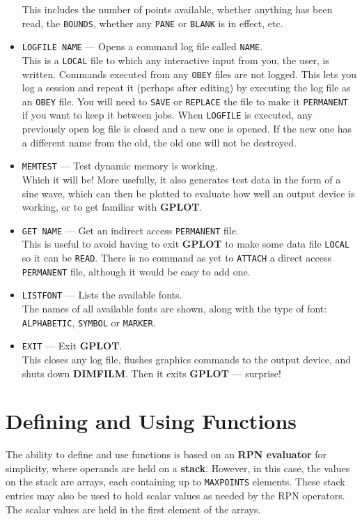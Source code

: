 \documentclass[a4paper,twoside,11pt]{article}
\newcommand{\textttc}[1]{\texttt{\textcolor{OurRed}{#1}}}
\begin{document}
\begin{itemize}
   This includes the number of points available, whether anything has been read, the \texttt{BOUNDS}, whether
   any \texttt{PANE} or \texttt{BLANK} is in effect, etc.
\item \textttc{LOGFILE NAME} --- Opens a command log file called \texttt{NAME}.\\
   This is a \texttt{LOCAL} file to which any interactive input from you, the user, is written. Commands executed
   from any \texttt{OBEY} files are not logged. This lets you log a session and repeat it (perhaps after editing)
   by executing the log file as an \texttt{OBEY} file. You will need to \texttt{SAVE} or \texttt{REPLACE} the file to make it
   \texttt{PERMANENT} if you want to keep it between jobs. When \texttt{LOGFILE} is executed, any previously open log file
   is closed and a new one is opened. If the new one has a different name from the old, the old one will
   not be destroyed.
\item \textttc{MEMTEST} --- Test dynamic memory is working.\\
   Which it will be! More usefully, it also generates test data in the form of a sine wave, which can then
   be plotted to evaluate how well an output device is working, or to get familiar with \textbf{GPLOT}.
\item \textttc{GET NAME} --- Get an indirect access \texttt{PERMANENT} file.\\
   This is useful to avoid having to exit \textbf{GPLOT} to make some data file \texttt{LOCAL} so it can be \texttt{READ}.
   There is no command as yet to \texttt{ATTACH} a direct access \texttt{PERMANENT} file, although it would be easy
   to add one.
\item \textttc{LISTFONT} --- Lists the available fonts.\\
	The names of all available fonts are shown, along with the type of font: \texttt{ALPHABETIC}, \texttt{SYMBOL} or 
	\texttt{MARKER}. 
\item \textttc{EXIT} --- Exit \textbf{GPLOT}.\\
   This closes any log file, flushes graphics commands to the output device, and shuts down \textbf{DIMFILM}. 
   Then it exits \textbf{GPLOT} --- surprise!
\end{itemize}

\section{Defining and Using Functions}
The ability to define and use functions is based on an \textbf{RPN evaluator} for simplicity, where operands are held on a \textbf{stack}.
However, in this case, the values on the
stack are arrays, each containing up to \texttt{MAXPOINTS} elements. These stack entries may also be used to hold scalar values
as needed by the RPN operators. The scalar values are held in the first element of the arrays. 
\end{document}
